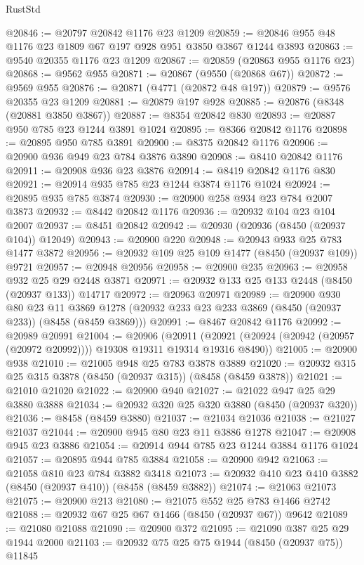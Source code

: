 \begin{lexlean}{RustStd}
\begin{coremodule}
@20846 := @20797 @20842 @1176 @23 @1209
@20859 := @20846 @955 @48 @1176 @23 @1809 @67 @197 @928 @951 @3850 @3867 @1244 @3893
@20863 := @9540 @20355 @1176 @23 @1209
@20867 := @20859 (@20863 @955 @1176 @23)
@20868 := @9562 @955
@20871 := @20867 (@9550 (@20868 @67))
@20872 := @9569 @955
@20876 := @20871 (@4771 (@20872 @48 @197))
@20879 := @9576 @20355 @23 @1209
@20881 := @20879 @197 @928
@20885 := @20876 (@8348 (@20881 @3850 @3867))
@20887 := @8354 @20842 @830
@20893 := @20887 @950 @785 @23 @1244 @3891 @1024
@20895 := @8366 @20842 @1176
@20898 := @20895 @950 @785 @3891
@20900 := @8375 @20842 @1176
@20906 := @20900 @936 @949 @23 @784 @3876 @3890
@20908 := @8410 @20842 @1176
@20911 := @20908 @936 @23 @3876
@20914 := @8419 @20842 @1176 @830
@20921 := @20914 @935 @785 @23 @1244 @3874 @1176 @1024
@20924 := @20895 @935 @785 @3874
@20930 := @20900 @258 @934 @23 @784 @2007 @3873
@20932 := @8442 @20842 @1176
@20936 := @20932 @104 @23 @104 @2007
@20937 := @8451 @20842
@20942 := @20930 (@20936 (@8450 (@20937 @104)) @12049)
@20943 := @20900 @220
@20948 := @20943 @933 @25 @783 @1477 @3872
@20956 := @20932 @109 @25 @109 @1477 (@8450 (@20937 @109)) @9721
@20957 := @20948 @20956
@20958 := @20900 @235
@20963 := @20958 @932 @25 @29 @2448 @3871
@20971 := @20932 @133 @25 @133 @2448 (@8450 (@20937 @133)) @14717
@20972 := @20963 @20971
@20989 := @20900
    @930
    @80
    @23
    @11
    @3869
    @1278
    (@20932 @233 @23 @233 @3869 (@8450 (@20937 @233)) (@8458 (@8459 @3869)))
@20991 := @8467 @20842 @1176
@20992 := @20989 @20991
@21004 := @20906
    (@20911 (@20921 (@20924 (@20942 (@20957 (@20972 @20992)))) @19308 @19311 @19314 @19316 @8490))
@21005 := @20900 @938
@21010 := @21005 @948 @25 @783 @3878 @3889
@21020 := @20932 @315 @25 @315 @3878 (@8450 (@20937 @315)) (@8458 (@8459 @3878))
@21021 := @21010 @21020
@21022 := @20900 @940
@21027 := @21022 @947 @25 @29 @3880 @3888
@21034 := @20932 @320 @25 @320 @3880 (@8450 (@20937 @320))
@21036 := @8458 (@8459 @3880)
@21037 := @21034 @21036
@21038 := @21027 @21037
@21044 := @20900 @945 @80 @23 @11 @3886 @1278
@21047 := @20908 @945 @23 @3886
@21054 := @20914 @944 @785 @23 @1244 @3884 @1176 @1024
@21057 := @20895 @944 @785 @3884
@21058 := @20900 @942
@21063 := @21058 @810 @23 @784 @3882 @3418
@21073 := @20932 @410 @23 @410 @3882 (@8450 (@20937 @410)) (@8458 (@8459 @3882))
@21074 := @21063 @21073
@21075 := @20900 @213
@21080 := @21075 @552 @25 @783 @1466 @2742
@21088 := @20932 @67 @25 @67 @1466 (@8450 (@20937 @67)) @9642
@21089 := @21080 @21088
@21090 := @20900 @372
@21095 := @21090 @387 @25 @29 @1944 @2000
@21103 := @20932 @75 @25 @75 @1944 (@8450 (@20937 @75)) @11845

\end{coremodule}
\end{lexlean}

